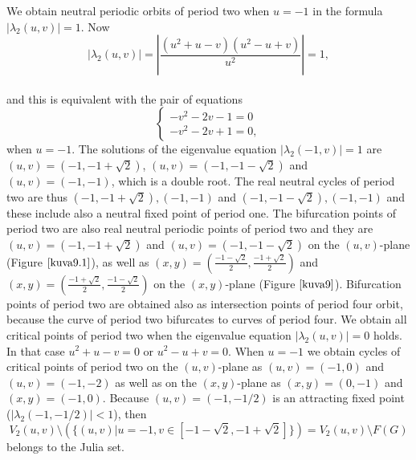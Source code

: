 \documentclass[12pt,a4paper]{amsart}
\numberwithin{equation}{section}
\numberwithin{lause}{section}
\begin{document}
We obtain neutral periodic orbits of period two when $u=-1$ in the formula $|\lambda_{2}(u,v)|=1$.
Now
\begin{displaymath}
|\lambda_{2}(u,v)|=\left|\frac {\left({u}^{2}+u-v \right) \left({u}^{2}-u+v \right)}{{u}^{2}}\right|=1,
\end{displaymath} \\
and this is equivalent with the pair of equations
\begin{displaymath}
\left\{\begin{array}{l}
      -v^{2}-2v-1=0 \\
      -v^{2}-2v+1=0,
\end{array}\right.
\end{displaymath}
when $u=-1$.
 The solutions of the eigenvalue equation $|\lambda_{2}(-1,v)|=1$ are $(u,v)=(-1,-1+\sqrt{2})$, $(u,v)=(-1,-1-\sqrt{2})$ and $(u,v)=(-1,-1)$, which is a double root. The real neutral cycles of period two are thus  $(-1,-1+\sqrt{2}),(-1,-1)$ and $(-1,-1-\sqrt{2}),(-1,-1)$ and these include also a neutral fixed point of period one. The bifurcation points of period two are also real neutral periodic points of period two and they are $(u,v)=(-1,-1+\sqrt{2})$ and $(u,v)=(-1,-1-\sqrt{2})$ on the $(u,v)$-plane (Figure $\ref{kuva9.1}$), as well as  $(x,y)=(\frac{-1-\sqrt{2}}{2},\frac{-1+\sqrt{2}}{2})$ and $(x,y)=(\frac{-1+\sqrt{2}}{2},\frac{-1-\sqrt{2}}{2})$ on the $(x,y)$-plane (Figure  $\ref{kuva9}$).
 Bifurcation points of period two are obtained also as intersection points of period four orbit, because the curve of period two bifurcates to curves of period four. We obtain all critical points of period two when the eigenvalue equation $|\lambda_{2}(u,v)|=0$ holds. In that case ${u}^{2}+u-v=0$ or ${u}^{2}-u+v=0$. When $u=-1$ we obtain cycles of critical points of period two on the $(u,v)$-plane as $(u,v)=(-1,0)$ and $(u,v)=(-1,-2)$ as well as on the $(x,y)$-plane as $(x,y)=(0,-1)$ and $(x,y)=(-1,0)$.
Because $(u,v)=(-1,-1/2)$ is an attracting fixed point ($|\lambda_{2}(-1,-1/2)|<1$), then
\begin{displaymath}
      V_{2}(u,v) \setminus \left(\{(u,v)|u=-1, v \in [-1-\sqrt{2},-1+\sqrt{2}]\}  \right) =V_{2}(u,v) \setminus F(G)
\end{displaymath}
belongs to the Julia set.
\end{document}
